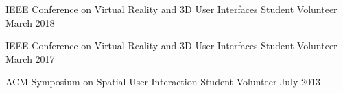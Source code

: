 \begin{cventries}
  \cventry
    {IEEE Conference on Virtual Reality and 3D User Interfaces} %
    {Student Volunteer} %
    {March 2018} %
    {} %
    {}
    \vspace{-0.15in}
    
  \cventry
    {IEEE Conference on Virtual Reality and 3D User Interfaces} %
    {Student Volunteer} %
    {March 2017} %
    {} %
    {}
    \vspace{-0.15in}
    
  \cventry
    {ACM Symposium on Spatial User Interaction} %
    {Student Volunteer} %
    {July 2013} %
    {} %
    {}
    \vspace{-0.15in}
    
    
    
    
    
\end{cventries}
  \vspace{-.25cm}
  \vspace{.25cm}
  
